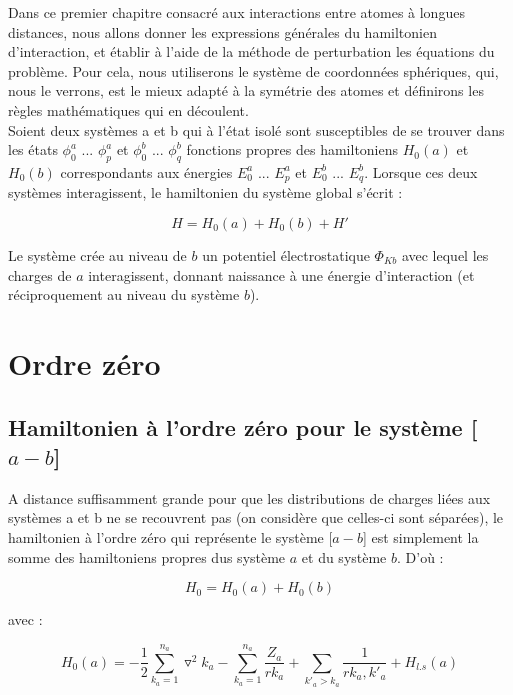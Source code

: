 	Dans ce premier chapitre consacré aux interactions entre atomes à longues distances, nous allons donner les expressions générales du hamiltonien d'interaction, et établir à l'aide de la méthode de perturbation les équations du problème. Pour cela, nous utiliserons le système de coordonnées sphériques, qui, nous le verrons, est le mieux adapté à la symétrie des atomes et définirons les règles mathématiques qui en découlent.\\ 
	
	Soient deux systèmes a et b qui à l'état isolé sont susceptibles de se trouver dans les états $\phi_{0}^{a}$ ... $\phi_{p}^{a}$ et $\phi_{0}^{b}$ ... $\phi_{q}^{b}$ fonctions propres des hamiltoniens $H_{0}(a)$ et $H_{0}(b)$ correspondants aux énergies $E_{0}^{a}$ ... $E_{p}^{a}$ et $E_{0}^{b}$ ... $E_{q}^{b}$. Lorsque ces deux systèmes interagissent, le hamiltonien du système global s'écrit : 
	
	\begin{equation}
	H = H_{0}(a) + H_{0}(b) + H'
	\end{equation}
	
	Le système crée au niveau de $b$ un potentiel électrostatique $\Phi_{Kb}$ avec lequel les charges de $a$ interagissent, donnant naissance à une énergie d'interaction (et réciproquement au niveau du système $b$).
	
	\section{Ordre zéro}
	
	\subsection{Hamiltonien à l'ordre zéro pour le système [$a-b$]}
	
	A distance suffisamment grande pour que les distributions de charges liées aux systèmes a et b ne se recouvrent pas (on considère que celles-ci sont séparées), le hamiltonien à l'ordre zéro qui représente le système [$a-b$] est simplement la somme des hamiltoniens propres dus système $a$ et du système $b$. D'où : 
	
	\begin{equation}
	H_{0} = H_{0}(a) + H_{0}(b) \label{1.2}
	\end{equation}
	
	avec : 
	
	\begin{equation}
	H_{0}(a) = -\frac{1}{2} \sum_{k_{a}=1}^{n_{a}} \triangledown^{2} k_{a} - \sum_{k_{a}=1}^{n_{a}} \frac{Z_{a}}{rk_{a}} + \sum_{k'_{a}>k_{a}} \frac{1}{rk_{a},k'_{a}} + H_{l.s}(a)  \label{1.3}
	\end{equation}
	
